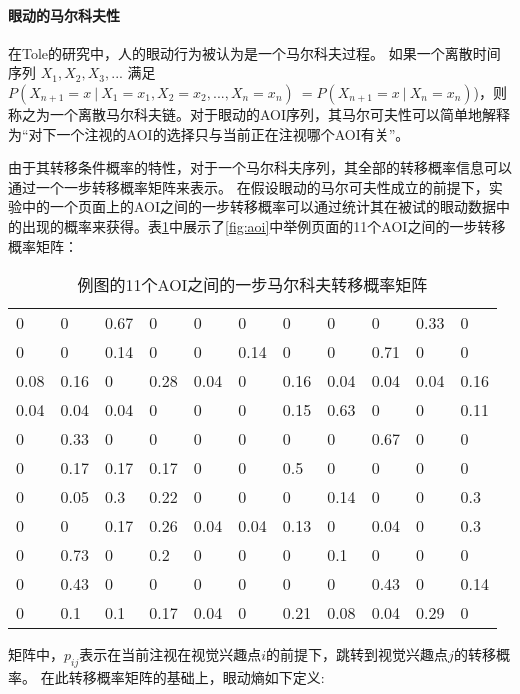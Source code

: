 \documentclass[master, fontset=mac, openany, oneside, zihao=-4]{sjtuthesis}
\begin{document}
\paragraph{眼动的马尔科夫性}
在Tole的研究中，人的眼动行为被认为是一个马尔科夫过程。
如果一个离散时间序列 $X_1,X_2,X_3,...$ 满足$P(X_{n+1}=x~|~X_1=x_1,X_2=x_2,...,X_n=x_n)~=P(X_{n+1}=x~|~X_n=x_n)$)，则称之为一个离散马尔科夫链。对于眼动的AOI序列，其马尔可夫性可以简单地解释为“对下一个注视的AOI的选择只与当前正在注视哪个AOI有关”。

由于其转移条件概率的特性，对于一个马尔科夫序列，其全部的转移概率信息可以通过一个一步转移概率矩阵来表示。
在假设眼动的马尔可夫性成立的前提下，实验中的一个页面上的AOI之间的一步转移概率可以通过统计其在被试的眼动数据中的出现的概率来获得。表\ref{tab:mat}中展示了\ref{fig:aoi}中举例页面的11个AOI之间的一步转移概率矩阵：

\begin{table}[H]
\centering
  \begin{tabular}{@{}lllllllllll@{}}
  \hline
  0    & 0    & 0.67 & 0    & 0    & 0    & 0    & 0    & 0    & 0.33 & 0    \\
  0    & 0    & 0.14 & 0    & 0    & 0.14 & 0    & 0    & 0.71 & 0    & 0    \\
  0.08 & 0.16 & 0    & 0.28 & 0.04 & 0    & 0.16 & 0.04 & 0.04 & 0.04 & 0.16 \\
  0.04 & 0.04 & 0.04 & 0    & 0    & 0    & 0.15 & 0.63 & 0    & 0    & 0.11 \\
  0    & 0.33 & 0    & 0    & 0    & 0    & 0    & 0    & 0.67 & 0    & 0    \\
  0    & 0.17 & 0.17 & 0.17 & 0    & 0    & 0.5  & 0    & 0    & 0    & 0    \\
  0    & 0.05 & 0.3  & 0.22 & 0    & 0    & 0    & 0.14 & 0    & 0    & 0.3  \\
  0    & 0    & 0.17 & 0.26 & 0.04 & 0.04 & 0.13 & 0    & 0.04 & 0    & 0.3  \\
  0    & 0.73 & 0    & 0.2  & 0    & 0    & 0    & 0.1  & 0    & 0    & 0    \\
  0    & 0.43 & 0    & 0    & 0    & 0    & 0    & 0    & 0.43 & 0    & 0.14 \\
  0    & 0.1  & 0.1  & 0.17 & 0.04 & 0    & 0.21 & 0.08 & 0.04 & 0.29 & 0\\
  \hline
  \end{tabular}
  \caption{例图的11个AOI之间的一步马尔科夫转移概率矩阵}
  \label{tab:mat}
\end{table}

矩阵中，$p_{ij}$表示在当前注视在视觉兴趣点$i$的前提下，跳转到视觉兴趣点$j$的转移概率。
在此转移概率矩阵的基础上，眼动熵如下定义:
\end{document}
